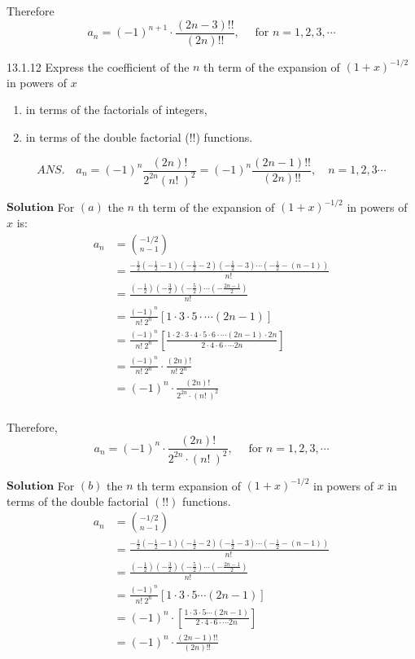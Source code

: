 Therefore
$$
a_{n}=(-1)^{n+1} \cdot \frac{(2 n-3) ! !}{(2 n) ! !}, \quad \text { for } n=1,2,3, \cdots
$$

\newpage

\begin{mybox}{13.1.12}
Express the coefficient of the $n$ th term of the expansion of $(1+x)^{-1 / 2}$ in powers of $x$
\begin{enumerate}[$(a)$]
\item in terms of the factorials of integers,
\item in terms of the double factorial
(!!) functions.
\end{enumerate}
$$
A N S . \quad a_{n}=(-1)^{n} \frac{(2 n) !}{2^{2 n}(n! \ )^{2}}=(-1)^{n} \frac{(2 n-1) ! !}{(2 n) ! !}, \quad n=1,2,3  \cdots
$$
\end{mybox}

$\boxed{\textbf{Solution}}$ For $(a)$ the $n$ th term of the expansion of $(1+x)^{-1 / 2}$ in powers of $x$ is:
$$
\begin{aligned}
a_{n} &= \binom{-1/2}{n-1} \\
&=\frac{-\frac{1}{2}\left(-\frac{1}{2}-1\right)\left(-\frac{1}{2}-2\right)\left(-\frac{1}{2}-3\right) \cdots\left(-\frac{1}{2}-(n-1)\right)}{n! \ } \\
&=\frac{\left(-\frac{1}{2}\right)\left(-\frac{3}{2}\right)\left(-\frac{5}{2}\right) \cdots\left(-\frac{2 n-1}{2}\right)}{n! \ } \\
&=\frac{(-1)^{n}}{n! \  2^{n}}[1 \cdot 3  \cdot 5  \cdot   \cdots (2 n-1)] \\
&=\frac{(-1)^{n}}{n! \  2^{n}}\left[\frac{1 \cdot 2  \cdot 3  \cdot 4  \cdot 5  \cdot 6  \cdot   \cdots (2 n-1) \cdot 2 n}{2 \cdot 4  \cdot 6  \cdot   \cdots 2 n}\right] \\
&=\frac{(-1)^{n}}{n! \  2^{n}} \cdot \frac{(2 n) !}{n! \  2^{n}} \\
&=(-1)^{n} \cdot \frac{(2 n) !}{2^{2 n} \cdot(n! \ )^{2}} \\
\end{aligned}
$$

Therefore, 
$$
a_{n}=(-1)^{n} \cdot \frac{(2 n) !}{2^{2 n} \cdot(n! \ )^{2}}, \quad \text { for } n=1,2,3, \cdots
$$

$\boxed{\textbf{Solution}}$ For $(b)$ the $n$ th term expansion of $(1+x)^{-1 / 2}$ in powers of $x$ in terms of the double factorial $(!!)$ functions.
$$
\begin{aligned}
a_{n}&=\binom{-1/2}{n-1} \\
&=\frac{-\frac{1}{2}\left(-\frac{1}{2}-1\right)\left(-\frac{1}{2}-2\right)\left(-\frac{1}{2}-3\right) \cdots\left(-\frac{1}{2}-(n-1)\right)}{n! \ } \\
&=\frac{\left(-\frac{1}{2}\right)\left(-\frac{3}{2}\right)\left(-\frac{5}{2}\right) \cdots\left(-\frac{2 n-1}{2}\right)}{n! \ } \\
&=\frac{(-1)^{n}}{n! \  2^{n}}[1 \cdot 3  \cdot 5   \cdots (2 n-1)] \\
&=(-1)^{n} \cdot\left[\frac{1 \cdot 3  \cdot 5   \cdots (2 n-1)}{2 \cdot 4  \cdot 6  \cdot   \cdots 2 n}\right] \\
&=(-1)^{n} \cdot \frac{(2 n-1) ! !}{(2 n) ! !} 
\end{aligned}
$$


